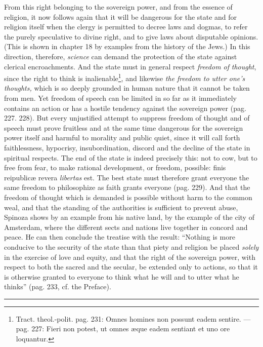 \documentclass[12pt,a4paper,openany]{book}
\newcommand{\opage}[1]{\marginnote{\footnotesize\textit{[#1]}}}
\begin{document}
From this right belonging to the sovereign power, and from the essence of religion, it now follows again that it will be dangerous for the state and for religion itself when the clergy is permitted to decree laws and dogmas, to refer the purely speculative to divine right, and to give laws about disputable opinions. (This is shown in chapter 18 by examples from the history of the Jews.) In this direction, therefore, \emph{science} can demand the protection of the state against clerical encroachments. And the state must in general respect \emph{freedom of}
\opage{161}\setcounter{footnote}{0}\emph{thought}, since the right to think is inalienable\footnote{Tract. theol.-polit. pag. 231: Omnes homines non possunt eadem sentire. --- pag. 227: Fieri non potest, ut omnes æque eadem sentiant et uno ore loquantur.}, and likewise \emph{the freedom to utter one's thoughts,} which is so deeply grounded in human nature that it cannot be taken from men. Yet freedom of speech can be limited in so far as it immediately contains an action or has a hostile tendency against the sovereign power (pag. 227. 228). But every unjustified attempt to suppress freedom of thought and of speech must prove fruitless and at the same time dangerous for the sovereign power itself and harmful to morality and public quiet, since it will call forth faithlessness, hypocrisy, insubordination, discord and the decline of the state in spiritual respects. The end of the state is indeed precisely this: not to cow, but to free from fear, to make rational development, or freedom, possible: finis reipublicæ revera \emph{libertas} est. The best state must therefore grant everyone the same freedom to philosophize as faith grants everyone (pag. 229). And that the freedom of thought which is demanded is possible without harm to the common weal, and that the standing of the authorities is sufficient to prevent abuse, Spinoza shows by an example from his native land, by the example of the city of Amsterdam, where the different sects and nations live together in concord and peace. He can then conclude the treatise with the result: ``Nothing is more conducive to the security of the state than that piety and religion be placed \emph{solely} in the exercise of love and equity, and that the right of the sovereign power, with respect to both the sacred and the secular, be extended only to actions, so that it is otherwise granted to everyone to think what he will and to utter what he thinks'' (pag. 233, cf. the Preface).

\bigskip
\begin{center}\rule{2.5cm}{0.4pt}\end{center}
\bigskip
\end{document}
